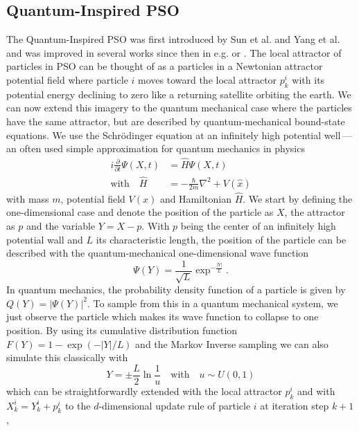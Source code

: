 \documentclass[a4paper, 11pt]{article}
\begin{document}
\subsection{Quantum-Inspired PSO}
The Quantum-Inspired PSO was first introduced by Sun et al. \cite{sun2004particle} and Yang et al. \cite{yang2004quantum} and was improved in several works since then in e.g. \cite{sun2012quantum} or \cite{flori2022quantum}. The local attractor of particles in PSO can be thought of as a particles in a Newtonian attractor potential field where particle $i$ moves toward the local attractor $p^i_{k}$ with its potential energy declining to zero like a returning satellite orbiting the earth. We can now extend this imagery to the quantum mechanical case where the particles have the same attractor, but are described by quantum-mechanical bound-state equations. We use the Schrödinger equation at an infinitely high potential well\,---\,an often used simple approximation for quantum mechanics in physics
\begin{align*}
    i\frac{\partial}{\partial t}\Psi(X,t) & = \hat{H}\Psi(X,t)
    \\ \text{with} \quad \hat{H}&= -\frac{\hbar}{2m}\nabla^2 + V(\hat{x})
\end{align*}
with mass $m$, potential field $V(x)$ and Hamiltonian $\hat{H}$. We start by defining the one-dimensional case and denote the position of the particle as $X$, the attractor as $p$ and the variable $Y=X-p$. With $p$ being the center of an infinitely high potential wall and $L$ its characteristic length, the position of the particle can be described with the quantum-mechanical one-dimensional wave function
\begin{equation}\label{qpso:wavefunction}
    \Psi(Y) = \frac{1}{\sqrt{L}}\exp^{-\frac{\lvert Y\rvert}{L}}.
\end{equation}
In quantum mechanics, the probability density function of a particle is given by $Q(Y)=\lvert \Psi(Y) \rvert^2$. To sample from this in a quantum mechanical system, we just observe the particle which makes its wave function to collapse to one position.
By using its cumulative distribution function $F(Y)=1-\exp{(-{\lvert Y\rvert/L})}$ and the Markov Inverse sampling we can also simulate this classically with
\begin{equation}\label{qpso:markovinverse}
    Y = \pm \frac{L}{2}\ln{\frac{1}{u}} \quad \text{with} \quad u\sim U(0,1)
\end{equation}
which can be straightforwardly extended with the local attractor $p^i_{k}$ and with $X^i_{k}=Y^i_{k}+p^i_{k}$ to the $d$-dimensional update rule of particle $i$ at iteration step $k+1$,
\end{document}

